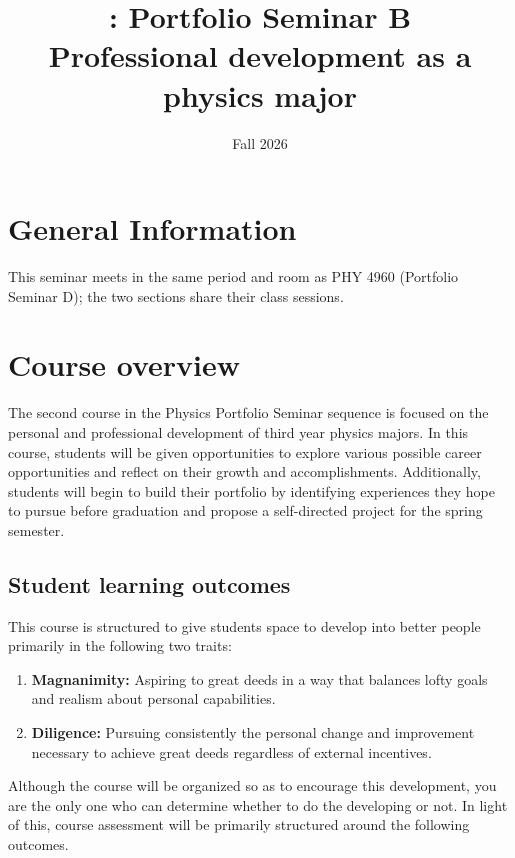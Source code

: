 \documentclass{syllabus}
\begin{document}
\thispagestyle{fancy}
\renewcommand{\lms}{Brightspace}
\date{Fall 2026}
\author{}
\title{\coursecode: Portfolio Seminar B \\ {\large \mdseries Professional development as a physics major}}
\maketitle



\section*{General Information}

\infotableport

\medskip
\noindent This seminar meets in the same period and room as PHY 4960 (Portfolio Seminar D); the two sections share their class sessions.

\section*{Course overview}

The second course in the Physics Portfolio Seminar sequence is focused on the personal and professional development of third year physics majors. In this course, students will be given opportunities to explore various possible career opportunities and reflect on their growth and accomplishments. Additionally, students will begin to build their portfolio by identifying experiences they hope to pursue before graduation and propose a self-directed project for the spring semester.

\subsection*{Student learning outcomes}
This course is structured to give students space to develop into better people primarily in the following two traits:
\begin{enumerate}[label=\textcolor{CarthageDark}{\bfseries\arabic*.}]
    \item\textbf{Magnanimity:} Aspiring to great deeds in a way that balances lofty goals and realism about personal capabilities.
    \item\textbf{Diligence:} Pursuing consistently the personal change and improvement necessary to achieve great deeds regardless of external incentives.
\end{enumerate}
Although the course will be organized so as to encourage this development, you are the only one who can determine whether to do the developing or not. In light of this, course assessment will be primarily structured around the following outcomes.
\end{document}
